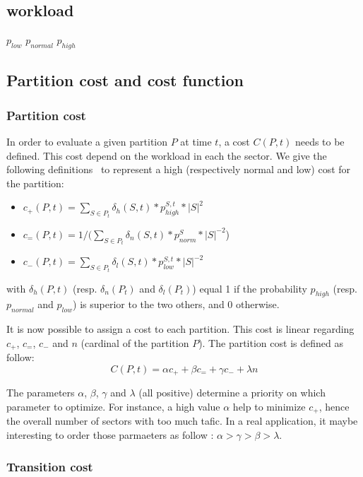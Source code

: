 \documentclass[twoside,twocolumn]{article}
\begin{document}
\subsection{workload}

$p_{low}$
$p_{normal}$
$p_{high}$

\subsection{Partition cost and cost function}

\subsubsection{Partition cost}

In order to evaluate a given partition $P$ at time $t$, a cost $C(P, t)$ needs
to be defined. This cost depend on the workload in each the sector. We give the
following definitions~\cite{ferrari2017} to represent a high
(respectively normal and low) cost for the partition:
\begin{itemize}
  \item $c_+(P, t) = \sum_{S \in P_t} \delta_{h}(S, t) * p_{high}^{S, t} * |S|^2$
  \item $c_=(P, t) = 1 / (\sum_{S \in P_t} \delta_{n}(S, t) * p_{norm}^{S} * |S|^{-2}$)
  \item $c_-(P, t) = \sum_{S \in P_t} \delta_{l}(S, t) * p_{low}^{S, t} * |S|^{-2}$
\end{itemize}
with $\delta_{h}(P, t)$ (resp. $\delta_{n}(P_t)$ and $\delta_{l}(P_t)$) equal 1
if the probability $p_{high}$ (resp. $p_{normal}$ and $p_{low}$) is superior to
the two others, and 0 otherwise.

It is now possible to assign a cost to each partition. This cost is linear
regarding $c_+$, $c_=$, $c_-$ and $n$ (cardinal of the partition $P$). The
partition cost is defined as follow:
\begin{equation}
C(P, t) = \alpha c_+ + \beta c_= + \gamma c_- +\lambda n  
\end{equation}

The parameters $\alpha$, $\beta$, $\gamma$ and $\lambda$ (all positive)
determine a priority on which parameter to optimize. For instance, a high
value $\alpha$ help to
minimize $c_+$, hence the overall number of sectors with too much tafic.
In a real application, it maybe interesting to order those parmaeters as
follow : $\alpha > \gamma > \beta > \lambda$.

\subsubsection{Transition cost}
\end{document}
